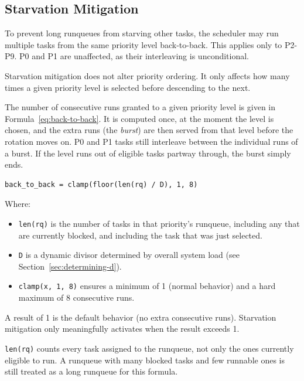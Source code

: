 \documentclass[11pt]{article}
\newcounter{formulacounter}
\newenvironment{specformula}[1]{%
    \refstepcounter{formulacounter}%
    \begin{tcolorbox}[colback=blue!3, colframe=black!60, boxrule=0.4pt,
        left=6pt, right=6pt, top=4pt, bottom=4pt,
        fonttitle=\bfseries, title={Formula~\theformulacounter: #1}, breakable]
}{%
    \end{tcolorbox}%
}
\begin{document}
\subsection{Starvation Mitigation}
\label{sec:starvation}

To prevent long runqueues from starving other tasks, the scheduler may run multiple tasks from the same priority level back-to-back.
This applies only to P2-P9.
P0 and P1 are unaffected, as their interleaving is unconditional.

Starvation mitigation does not alter priority ordering.
It only affects how many times a given priority level is selected before descending to the next.

The number of consecutive runs granted to a given priority level is given in Formula~\ref{eq:back-to-back}.
It is computed once, at the moment the level is chosen, and the extra runs (the \textit{burst}) are then served from that level before the rotation moves on.
P0 and P1 tasks still interleave between the individual runs of a burst.
If the level runs out of eligible tasks partway through, the burst simply ends.

\begin{specformula}{Back-to-Back Run Count}
	\label{eq:back-to-back}
	\begin{Verbatim}[fontsize=\small]
		back_to_back = clamp(floor(len(rq) / D), 1, 8)
	\end{Verbatim}
\end{specformula}

Where:

\begin{itemize}
	\item \texttt{len(rq)} is the number of tasks in that priority's runqueue, including any that are currently blocked, and including the task that was just selected.
	\item \texttt{D} is a dynamic divisor determined by overall system load (see Section~\ref{sec:determining-d}).
	\item \texttt{clamp(x, 1, 8)} ensures a minimum of 1 (normal behavior) and a hard maximum of 8 consecutive runs.
\end{itemize}

A result of 1 is the default behavior (no extra consecutive runs).
Starvation mitigation only meaningfully activates when the result exceeds 1.

\begin{specnote}
	\texttt{len(rq)} counts every task assigned to the runqueue, not only the ones currently eligible to run.
	A runqueue with many blocked tasks and few runnable ones is still treated as a long runqueue for this formula.
\end{specnote}
\end{document}
